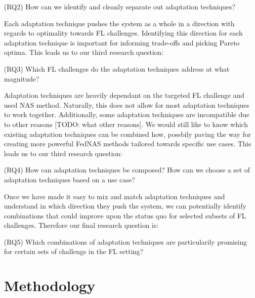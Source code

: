 \vspace{1em}
(RQ2) How can we identify and cleanly separate out adaptation techniques?
\vspace{1em}

Each adaptation technique pushes the system as a whole in a direction with regards to optimality towards FL challenges. Identifying this direction for each adaptation technique is important for informing trade-offs and picking Pareto optima. This leads us to our third research question:

\vspace{1em}
(RQ3) Which FL challenges do the adaptation techniques address at what magnitude?
\vspace{1em}

Adaptation techniques are heavily dependant on the targeted FL challenge and used NAS method. Naturally, this does not allow for most adaptation techniques to work together. Additionally, some adaptation techniques are incompatible due to other reasons [TODO: what other reasons]. We would still like to know which existing adaptation techniques can be combined how, possbily paving the way for creating more powerful FedNAS methods tailored towards specific use cases. This leads us to our third research question:

\vspace{1em}
(RQ4) How can adaptation techniques be composed? How can we choose a set of adaptation techniques based on a use case?
\vspace{1em}

Once we have made it easy to mix and match adaptation techniques and understand in which direction they push the system, we can potentially identify combinations that could improve upon the status quo for selected subsets of FL challenges. Therefore our final research question is:

\vspace{1em}
(RQ5) Which combinations of adaptation techniques are particularily promising for certain sets of challengs in the FL setting?
\vspace{1em}

\section{Methodology}


